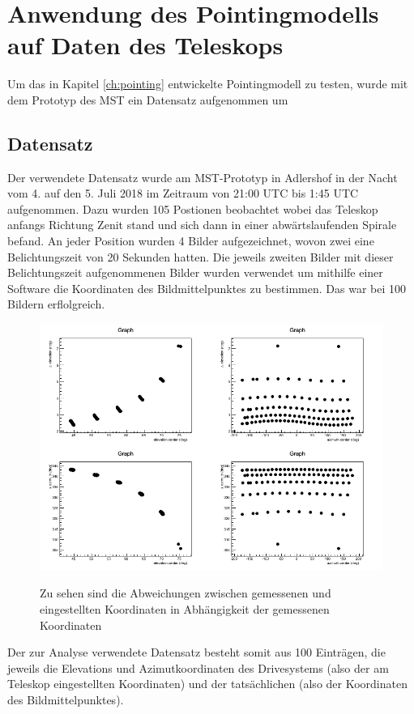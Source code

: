 \chapter{Anwendung des Pointingmodells auf Daten des Teleskops}
\label{ch:auswertung}
Um das in Kapitel \ref{ch:pointing} entwickelte Pointingmodell zu testen, wurde mit dem Prototyp des MST ein Datensatz aufgenommen um
\section{Datensatz}
Der verwendete Datensatz wurde am MST-Prototyp in Adlershof in der Nacht vom 4. auf den 5. Juli 2018 im Zeitraum von 21:00 UTC bis 1:45 UTC aufgenommen. Dazu wurden 105 Postionen beobachtet wobei das Teleskop anfangs Richtung Zenit stand und sich dann in einer abwärtslaufenden Spirale befand. An jeder Position wurden 4 Bilder aufgezeichnet, wovon zwei eine Belichtungszeit von 20 Sekunden hatten. Die jeweils zweiten Bilder mit dieser Belichtungszeit aufgenommenen Bilder wurden verwendet um mithilfe einer Software die Koordinaten des Bildmittelpunktes zu bestimmen. Das war bei 100 Bildern erflolgreich.
\begin{figure}[htbp]
\centering
\includegraphics[width=\textwidth]{../341/data2.png}
\label{img:dataset}
\caption{Zu sehen sind die Abweichungen zwischen gemessenen und eingestellten Koordinaten in Abhängigkeit der gemessenen Koordinaten}
\end{figure}
Der zur Analyse verwendete Datensatz besteht somit aus 100 Einträgen, die jeweils die Elevations und Azimutkoordinaten des Drivesystems (also der am Teleskop eingestellten Koordinaten) und der tatsächlichen (also der Koordinaten des Bildmittelpunktes).
